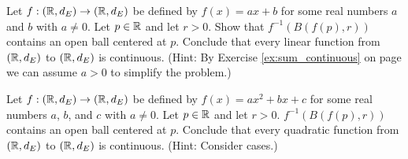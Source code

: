 \item \label{ex:linear_continuous}
	\ba
	\item Let $f: (\mathbb{R},d_E) \to (\mathbb{R},d_E)$ be defined by $f(x) = ax+b$ for some real numbers $a$ and $b$ with $a \neq 0$. Let $p \in \mathbb{R}$ and let $r > 0$. Show that $f^{-1}(B(f(p),r))$ contains an open ball centered at $p$. Conclude that every linear function from $(\mathbb{R},d_E)$ to $(\mathbb{R},d_E)$ is continuous. (Hint: By Exercise \ref{ex:sum_continuous} on page \pageref{ex:sum_continuous} we can assume $a > 0$ to simplify the problem.)
	
	\item Let $f: (\mathbb{R},d_E) \to (\mathbb{R},d_E)$ be defined by $f(x) = ax^2+bx+c$ for some real numbers $a$, $b$, and $c$ with $a \neq 0$. Let $p \in \mathbb{R}$ and let $r > 0$. $f^{-1}(B(f(p),r))$ contains an open ball centered at $p$. Conclude that every quadratic function from $(\mathbb{R},d_E)$ to $(\mathbb{R},d_E)$ is continuous. (Hint: Consider cases.)
	
	\ea
	
